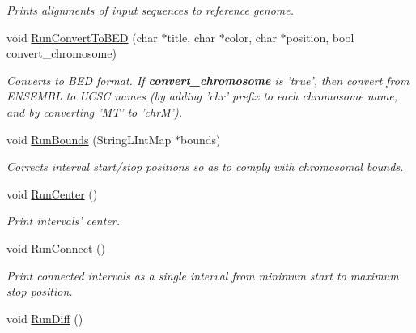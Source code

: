 \begin{CompactItemize}
\begin{CompactList}\small\item\em Prints alignments of input sequences to reference genome. \item\end{CompactList}\item 
\hypertarget{classGenomicRegionSet_18669fb4dfdf1287aaf9cfceb8329cb5}{
void \hyperlink{classGenomicRegionSet_18669fb4dfdf1287aaf9cfceb8329cb5}{RunConvertToBED} (char $\ast$title, char $\ast$color, char $\ast$position, bool convert\_\-chromosome)}
\label{classGenomicRegionSet_18669fb4dfdf1287aaf9cfceb8329cb5}

\begin{CompactList}\small\item\em Converts to BED format. If {\bf convert\_\-chromosome} is 'true', then convert from ENSEMBL to UCSC names (by adding 'chr' prefix to each chromosome name, and by converting 'MT' to 'chrM'). \item\end{CompactList}\item 
\hypertarget{classGenomicRegionSet_d7ad039dd702837f37c2cdfebd9b2845}{
void \hyperlink{classGenomicRegionSet_d7ad039dd702837f37c2cdfebd9b2845}{RunBounds} (StringLIntMap $\ast$bounds)}
\label{classGenomicRegionSet_d7ad039dd702837f37c2cdfebd9b2845}

\begin{CompactList}\small\item\em Corrects interval start/stop positions so as to comply with chromosomal bounds. \item\end{CompactList}\item 
\hypertarget{classGenomicRegionSet_1aa8f41f0978e9b66c6f11c0ccb95a0b}{
void \hyperlink{classGenomicRegionSet_1aa8f41f0978e9b66c6f11c0ccb95a0b}{RunCenter} ()}
\label{classGenomicRegionSet_1aa8f41f0978e9b66c6f11c0ccb95a0b}

\begin{CompactList}\small\item\em Print intervals' center. \item\end{CompactList}\item 
\hypertarget{classGenomicRegionSet_752b7d4d2ac3568e7bdb13edbfc00af3}{
void \hyperlink{classGenomicRegionSet_752b7d4d2ac3568e7bdb13edbfc00af3}{RunConnect} ()}
\label{classGenomicRegionSet_752b7d4d2ac3568e7bdb13edbfc00af3}

\begin{CompactList}\small\item\em Print connected intervals as a single interval from minimum start to maximum stop position. \item\end{CompactList}\item 
\hypertarget{classGenomicRegionSet_90256738bd85501460874ab8e69b894b}{
void \hyperlink{classGenomicRegionSet_90256738bd85501460874ab8e69b894b}{RunDiff} ()}
\label{classGenomicRegionSet_90256738bd85501460874ab8e69b894b}


\end{CompactItemize}
